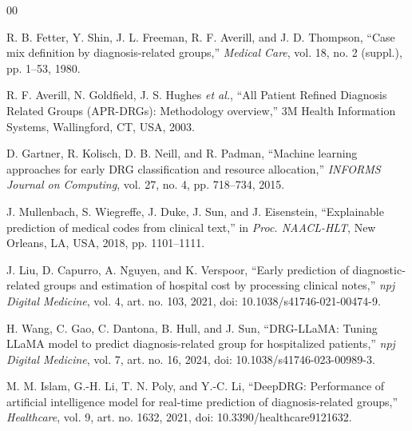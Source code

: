\documentclass{ieeeaccess}
\begin{document}
\begin{thebibliography}{00}

 R. B. Fetter, Y. Shin, J. L. Freeman, R. F. Averill, and J. D. Thompson, ``Case mix definition by diagnosis-related groups,'' \emph{Medical Care}, vol. 18, no. 2 (suppl.), pp. 1--53, 1980.

 R. F. Averill, N. Goldfield, J. S. Hughes \emph{et al.}, ``All Patient Refined Diagnosis Related Groups (APR-DRGs): Methodology overview,'' 3M Health Information Systems, Wallingford, CT, USA, 2003.

 D. Gartner, R. Kolisch, D. B. Neill, and R. Padman, ``Machine learning approaches for early DRG classification and resource allocation,'' \emph{INFORMS Journal on Computing}, vol. 27, no. 4, pp. 718--734, 2015.

 J. Mullenbach, S. Wiegreffe, J. Duke, J. Sun, and J. Eisenstein, ``Explainable prediction of medical codes from clinical text,'' in \emph{Proc. NAACL-HLT}, New Orleans, LA, USA, 2018, pp. 1101--1111.

 J. Liu, D. Capurro, A. Nguyen, and K. Verspoor, ``Early prediction of diagnostic-related groups and estimation of hospital cost by processing clinical notes,'' \emph{npj Digital Medicine}, vol. 4, art. no. 103, 2021, doi: 10.1038/s41746-021-00474-9.

 H. Wang, C. Gao, C. Dantona, B. Hull, and J. Sun, ``DRG-LLaMA: Tuning LLaMA model to predict diagnosis-related group for hospitalized patients,'' \emph{npj Digital Medicine}, vol. 7, art. no. 16, 2024, doi: 10.1038/s41746-023-00989-3.

 M. M. Islam, G.-H. Li, T. N. Poly, and Y.-C. Li, ``DeepDRG: Performance of artificial intelligence model for real-time prediction of diagnosis-related groups,'' \emph{Healthcare}, vol. 9, art. no. 1632, 2021, doi: 10.3390/healthcare9121632.

\end{thebibliography}

\EOD
\end{document}
